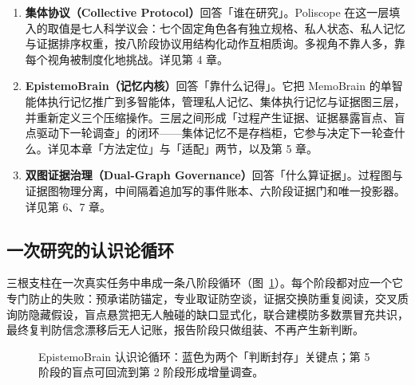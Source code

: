 \begin{enumerate}[leftmargin=1.6em, itemsep=5pt]
\item \textbf{集体协议（Collective Protocol）}回答「谁在研究」。Poliscope 在这一层填入的取值是七人科学议会：七个固定角色各有独立规格、私人状态、私人记忆与证据排序权重，按八阶段协议用结构化动作互相质询。多视角不靠人多，靠每个视角被制度化地挑战。详见第 4 章。
\item \textbf{EpistemoBrain（记忆内核）}回答「靠什么记得」。它把 MemoBrain 的单智能体执行记忆推广到多智能体，管理私人记忆、集体执行记忆与证据图三层，并重新定义三个压缩操作。三层之间形成「过程产生证据、证据暴露盲点、盲点驱动下一轮调查」的闭环——集体记忆不是存档柜，它参与决定下一轮查什么。详见本章「方法定位」与「适配」两节，以及第 5 章。
\item \textbf{双图证据治理（Dual-Graph Governance）}回答「什么算证据」。过程图与证据图物理分离，中间隔着追加写的事件账本、六阶段证据门和唯一投影器。详见第 6、7 章。
\end{enumerate}

\subsection{一次研究的认识论循环}

三根支柱在一次真实任务中串成一条八阶段循环（图~\ref{fig:loop}）。每个阶段都对应一个它专门防止的失败：预承诺防锚定，专业取证防空谈，证据交换防重复阅读，交叉质询防隐藏假设，盲点悬赏把无人触碰的缺口显式化，联合建模防多数票冒充共识，最终复判防信念漂移后无人记账，报告阶段只做组装、不再产生新判断。

\begin{figure}[ht]
\centering
{}
\caption{EpistemoBrain 认识论循环：蓝色为两个「判断封存」关键点；第 5 阶段的盲点可回流到第 2 阶段形成增量调查。}
\label{fig:loop}
\end{figure}

